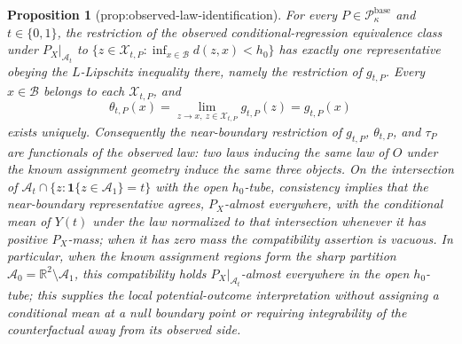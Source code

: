 \documentclass{article}
\newtheorem{proposition}{Proposition}
\begin{document}
\begin{proposition}[prop:observed-law-identification]\label{prop:observed-law-identification}
For every \(P\in\mathcal P_{\kappa}^{\mathrm{base}}\) and \(t\in\{0,1\}\), the restriction of the observed conditional-regression equivalence class under \(P_X|_{\mathcal A_t}\) to \(\{z\in\mathcal X_{t,P}:\inf_{x\in\mathcal B}d(z,x)<h_0\}\) has exactly one representative obeying the \(L\)-Lipschitz inequality there, namely the restriction of \(g_{t,P}\). Every \(x\in\mathcal B\) belongs to each \(\mathcal X_{t,P}\), and
\[
\theta_{t,P}(x)=\lim_{z\to x,\ z\in\mathcal X_{t,P}}g_{t,P}(z)=g_{t,P}(x)
\]
exists uniquely. Consequently the near-boundary restriction of \(g_{t,P}\), \(\theta_{t,P}\), and \(\tau_P\) are functionals of the observed law: two laws inducing the same law of \(O\) under the known assignment geometry induce the same three objects. On the intersection of \(\mathcal A_t\cap\{z:\mathbf 1\{z\in\mathcal A_1\}=t\}\) with the open \(h_0\)-tube, consistency implies that the near-boundary representative agrees, \(P_X\)-almost everywhere, with the conditional mean of \(Y(t)\) under the law normalized to that intersection whenever it has positive \(P_X\)-mass; when it has zero mass the compatibility assertion is vacuous. In particular, when the known assignment regions form the sharp partition \(\mathcal A_0=\mathbb R^2\setminus\mathcal A_1\), this compatibility holds \(P_X|_{\mathcal A_t}\)-almost everywhere in the open \(h_0\)-tube; this supplies the local potential-outcome interpretation without assigning a conditional mean at a null boundary point or requiring integrability of the counterfactual away from its observed side.
\end{proposition}
\end{document}

